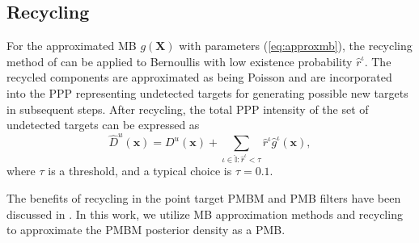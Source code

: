 \documentclass[journal]{IEEEtran}
\begin{document}
\subsection{Recycling}
For the approximated MB $g(\mathbf{X})$ with parameters (\ref{eq:approxmb}), the recycling method of \cite{recycle} can be applied to Bernoullis with low existence probability $\hat{r}^{\iota}$. The recycled components are approximated as being Poisson and are incorporated into the PPP representing undetected targets for generating possible new targets in subsequent steps. 
After recycling, the total PPP intensity of the set of undetected targets can be expressed as
\begin{equation}
    \hat{D}^u(\mathbf{x}) = D^u(\mathbf{x}) + \sum_{\iota\in\hat{\mathbb{I}}:\hat{r}^{\iota}<\tau}\hat{r}^{\iota}\hat{g}^{\iota}(\mathbf{x}),
\end{equation}
where $\tau$ is a threshold, and a typical choice is $\tau=0.1$.

The benefits of recycling in the point target PMBM and PMB filters have been discussed in \cite{recycle,performanceevaluation}. In this work, we utilize MB approximation methods and recycling to approximate the PMBM posterior density as a PMB.
\end{document}

